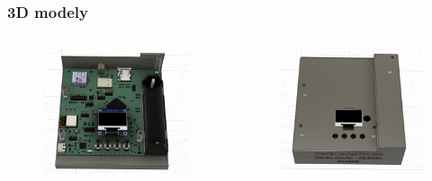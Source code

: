 \documentclass[%
  12pt,       				%
	t,                  %
	aspectratio=1610,   %
	unicode,						%
]{beamer}				    	%
\begin{document}
\begin{frame} 
	\frametitle{3D modely}
	\begin{columns}[T] 								%
		\begin{column}{0.5\textwidth}		%
		\begin{figure}%
		\centering
		\includegraphics[width=1\columnwidth]{obrazky/boxNoLid}
		\end{figure}
		\end{column}
		\begin{column}{0.5\textwidth}		%
		\begin{figure}%
		\centering
		\includegraphics[width=1\columnwidth]{obrazky/boxWithLid}
		\end{figure}
		\end{column}
	\end{columns}	
\end{frame}
\end{document}
